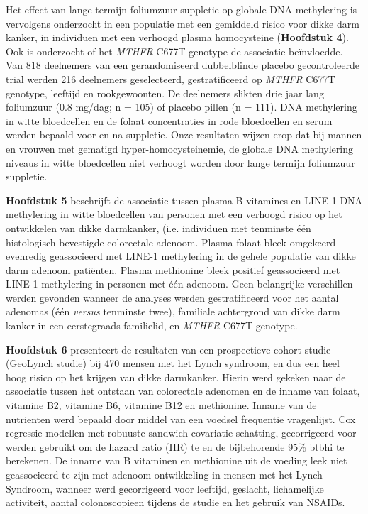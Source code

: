 \noindent Het effect van lange termijn foliumzuur suppletie op globale DNA methylering is vervolgens onderzocht in een populatie met een gemiddeld risico voor dikke darm kanker, in individuen met een verhoogd plasma homocysteine (\textbf{Hoofdstuk 4}). Ook is onderzocht of het \emph{MTHFR} C677T genotype de associatie be\"invloedde. Van 818 deelnemers van een gerandomiseerd dubbelblinde placebo gecontroleerde trial werden 216 deelnemers geselecteerd, gestratificeerd op \emph{MTHFR} C677T genotype, leeftijd en rookgewoonten. De deelnemers slikten drie jaar lang foliumzuur (0.8 mg/dag; n = 105) of placebo pillen (n = 111). DNA methylering in witte bloedcellen en de folaat concentraties in rode bloedcellen en serum werden bepaald voor en na suppletie. Onze resultaten wijzen erop dat bij mannen en vrouwen met gematigd hyper-homocysteinemie, de globale DNA methylering niveaus in witte bloedcellen niet verhoogt worden door lange termijn foliumzuur suppletie.

\noindent \textbf{Hoofdstuk 5} beschrijft de associatie tussen plasma B vitamines en LINE-1 DNA methylering in witte bloedcellen van personen met een verhoogd risico op het ontwikkelen van dikke darmkanker, (i.e. individuen met tenminste \'e\'en histologisch bevestigde colorectale adenoom. Plasma folaat bleek omgekeerd evenredig geassocieerd met LINE-1 methylering in de gehele populatie van dikke darm adenoom pati\"enten. Plasma methionine bleek positief geassocieerd met LINE-1 methylering in personen met \'e\'en adenoom. Geen belangrijke verschillen werden gevonden wanneer de analyses werden gestratificeerd voor het aantal adenomas (\'e\'en \emph{versus} tenminste twee), familiale achtergrond van dikke darm kanker in een eerstegraads familielid, en \emph{MTHFR} C677T genotype.

\noindent \textbf{Hoofdstuk 6} presenteert de resultaten van een prospectieve cohort studie (GeoLynch studie) bij 470 mensen met het Lynch syndroom, en dus een heel hoog risico op het krijgen van dikke darmkanker. Hierin werd gekeken naar de associatie tussen het ontstaan van colorectale adenomen en de inname van folaat, vitamine B2, vitamine B6, vitamine B12 en methionine. Inname van de nutrienten werd bepaald door middel van een voedsel frequentie vragenlijst. Cox regressie modellen met robuuste sandwich covariatie schatting, gecorrigeerd voor werden gebruikt om de hazard ratio (HR) te en de bijbehorende 95\% btbhi te berekenen. De inname van B vitaminen en methionine uit de voeding leek niet geassocieerd te zijn met adenoom ontwikkeling in mensen met het Lynch Syndroom, wanneer werd gecorrigeerd voor leeftijd, geslacht, lichamelijke activiteit, aantal colonoscopieen tijdens de studie en het gebruik van NSAIDs.


